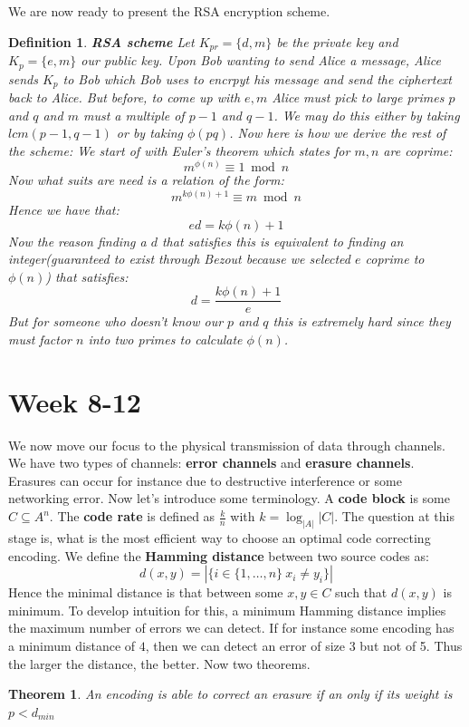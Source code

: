 \documentclass[titlepage]{article}
\newtheorem{theorem}{Theorem}[section]
\newtheorem{definition}{Definition}
\begin{document}
We are now ready to present the RSA encryption scheme.
\begin{definition}\textbf{RSA scheme}
Let $K_{pr} = \{d,m\}$ be the private key and $K_{p} = \{e,m\}$ our public key. Upon Bob wanting to send Alice a message, Alice sends $K_{p}$ to Bob which Bob uses to encrpyt his message and send the ciphertext back to Alice. But before, to come up with $e,m$ Alice must pick to large primes $p$ and $q$ and $m$ must a multiple of $p-1$ and $q-1$. We may do this either by taking $lcm(p-1,q-1)$ or by taking $\phi(pq)$. Now here is how we derive the rest of the scheme:
We start of with Euler's theorem which states for $m,n$ are coprime:
$$m^{\phi(n)} \equiv 1 \bmod{n}$$
Now what suits are need is a relation of the form:
$$m^{k\phi(n) + 1} \equiv m \bmod{n}$$
Hence we have that:
$$ed = k\phi(n)+1$$
Now the reason finding a $d$ that satisfies this is equivalent to finding an integer(guaranteed to exist through Bezout because we selected $e$ coprime to $\phi(n)$) that satisfies:
$$d = \frac{k\phi(n)+1}{e}$$
But for someone who doesn't know our $p$ and $q$ this is extremely hard since they must factor $n$ into two primes to calculate $\phi(n)$. 
\end{definition}


\section{Week 8-12}
We now move our focus to the physical transmission of data through channels. We have two types of channels: \textbf{error channels} and \textbf{erasure channels}. Erasures can occur for instance due to destructive interference or some networking error. Now let's introduce some terminology. A \textbf{code block} is some $C \subseteq A^{n}$. The \textbf{code rate} is defined as $\frac{k}{n}$ with $k = \log_{|A|}{|C|}$. The question at this stage is, what is the most efficient way to choose an optimal code correcting encoding. We define the \textbf{Hamming distance} between two source codes as:
$$d(x,y) = |\{i \in \{1,\ldots,n\} \ x_{i} \not = y_{i} \}|$$
Hence the minimal distance is that between some $x,y \in C$ such that $d(x,y)$ is minimum. To develop intuition for this, a minimum Hamming distance implies the maximum number of errors we can detect. If for instance some encoding has a minimum distance of $4$, then we can detect an error of size 3 but not of 5. Thus the larger the distance, the better. Now two theorems.

\begin{theorem}
An encoding is able to correct an erasure if an only if its weight is $p < d_{min}$
\end{theorem}
\end{document}
